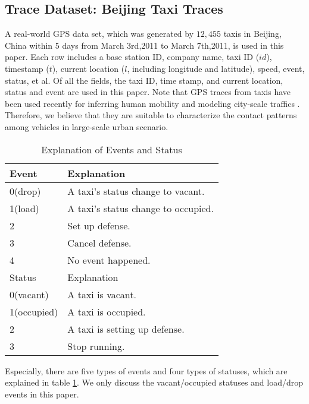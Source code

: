 \subsection{Trace Dataset: Beijing Taxi Traces}
\label{section_trace_data}

A real-world GPS data set, which was generated by $12,455$ taxis in Beijing, China within 5 days from March 3rd,2011 to March 7th,2011, is used in this paper.
Each row includes a base station ID, company name, taxi ID ($id$), timestamp ($t$), current location ($l$, including longitude and latitude), speed, event, status, et al. Of all the fields, the taxi ID, time stamp, and current location, status and event are used in this paper. Note that GPS traces from taxis have been used recently for inferring human mobility \cite{Ganti} and modeling city-scale traffics \cite{Aslam}. Therefore, we believe that they are suitable to characterize the contact patterns among vehicles in large-scale urban scenario.

\begin{table}[!h]
\caption{Explanation of Events and Status}\label{table_event_detail}
\centering
\begin{tabular}{l|l}
  \hline
  Event & Explanation \\
  \hline
  0(drop) & A taxi's status change to vacant.\\
  \hline
  1(load) & A taxi's status change to occupied.\\
  \hline
  2 & Set up defense.\\
  \hline
  3 & Cancel defense.\\
  \hline
  4 & No event happened.\\
  \hline
  \hline
  Status & Explanation \\
  \hline
0(vacant) & A taxi is vacant. \\
    \hline
1(occupied) & A taxi is occupied. \\
    \hline
2 & A taxi is setting up defense. \\
    \hline
3 & Stop running.\\
  \hline
\end{tabular}
\end{table}


Especially, there are five types of events and four types of statuses, which are explained in table \ref{table_event_detail}. We only discuss the vacant/occupied statuses and load/drop events in this paper. 







